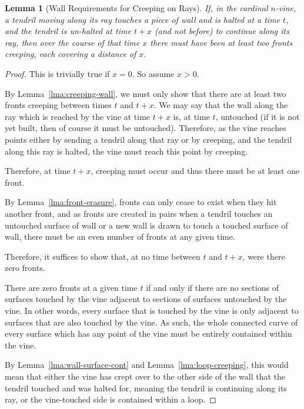 \documentclass[12pt]{article}
\theoremstyle{plain}
\newtheorem{lemma}[theorem]{Lemma}
\theoremstyle{definition}
\begin{document}
\begin{lemma}[Wall Requirements for Creeping on Rays]
\label{lma:wall-reqs-rays}
If, in the cardinal \(n\)-vine, a tendril moving along its ray touches a piece of wall and is halted at a time \(t\), and the tendril is un-halted at time \(t+x\) (and not before) to continue along its ray, then over the course of that time \(x\) there must have been at least two fronts creeping, each covering a distance of \(x\). 
\end{lemma}
\begin{proof}[Proof]
This is trivially true if \(x=0\). So assume \(x>0\). 

By Lemma~\ref{lma:creeping-wall}, we must only show that there are at least two fronts creeping between times \(t\) and \(t+x\). We may say that the wall along the ray which is reached by the vine at time \(t+x\) is, at time \(t\), untouched (if it is not yet built, then of course it must be untouched). Therefore, as the vine reaches points either by sending a tendril along that ray or by creeping, and the tendril along this ray is halted, the vine must reach this point by creeping. 

Therefore, at time \(t+x\), creeping must occur and thus there must be at least one front. 

By Lemma~\ref{lma:front-erasure}, fronts can only cease to exist when they hit another front, and as fronts are created in pairs when a tendril touches an untouched surface of wall or a new wall is drawn to touch a touched surface of wall, there must be an even number of fronts at any given time. 

Therefore, it suffices to show that, at no time between \(t\) and \(t+x\), were there zero fronts. 

There are zero fronts at a given time \(t\) if and only if there are no sections of surfaces touched by the vine adjacent to sections of surfaces untouched by the vine. In other words, every surface that is touched by the vine is only adjacent to surfaces that are also touched by the vine. As such, the whole connected curve of every surface which has any point of the vine must be entirely contained within the vine. 

By Lemma~\ref{lma:wall-surface-cont} and Lemma~\ref{lma:loop-creeping}, this would mean that either the vine has crept over to the other side of the wall that the tendril touched and was halted for, meaning the tendril is continuing along its ray, or the vine-touched side is contained within a loop. 


\end{proof}
\end{document}
